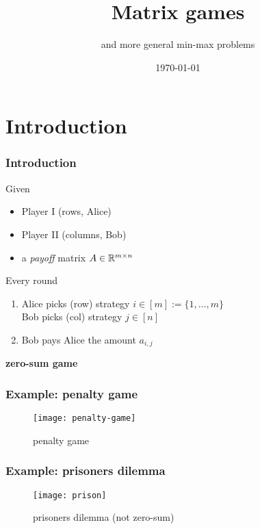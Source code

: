\documentclass[aspectratio=149]{beamer}
\title{Matrix games}
\subtitle{and more general min-max problems}
\date{\today}
\begin{document}
\maketitle
\frame{\tableofcontents}

\section{Introduction}%

\begin{frame}
  \frametitle{Introduction}
  Given
  \begin{itemize}
    \item Player I (rows, Alice)
          \item Player II (columns, Bob)
          \item a \emph{payoff} matrix $A \in \mathbb{R}^{m \times n}$
  \end{itemize}
  Every round
  \begin{enumerate}
    \item Alice picks (row) strategy $i\in [m]:= \{1,\dots, m\}$\\
          Bob picks (col) strategy $j\in [n]$
    \item Bob pays Alice the amount $a_{i,j}$
  \end{enumerate}
  \begin{center}
    \textbf{zero-sum game}
  \end{center}
\end{frame}

\begin{frame}
  \frametitle{Example: penalty game}
  \begin{figure}[ht]
    \centering
    \texttt{[image: penalty-game]}
    \caption{penalty game}
  \end{figure}
\end{frame}

\begin{frame}
  \frametitle{Example: prisoners dilemma}
  \begin{figure}[ht]
    \centering
    \texttt{[image: prison]}
    \caption{prisoners dilemma (not zero-sum)}
  \end{figure}
\end{frame}
\end{document}
